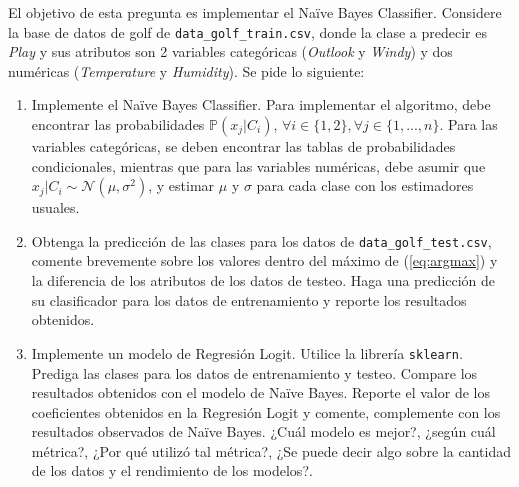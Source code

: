 \documentclass[letterpaper,11pt]{article}
\theoremstyle{plain}
\theoremstyle{definition}
\newcommand{\1}{\mathbbm{1}}
\begin{document}
\begin{enumerate}
El objetivo de esta pregunta es implementar el Naïve Bayes Classifier. Considere la base de datos de golf de \texttt{data\_golf\_train.csv}, donde la clase a predecir es \textit{Play} y sus atributos son 2 variables categóricas (\textit{Outlook} y \textit{Windy}) y dos numéricas (\textit{Temperature} y \textit{Humidity}). Se pide lo siguiente:

\begin{enumerate}
    \item Implemente el Naïve Bayes Classifier. Para implementar el algoritmo, debe encontrar las probabilidades $\mathbb{P}(x_j|C_i)$, $\forall i \in \{1,2\}, \forall j\in \{1,...,n\}$. Para las variables categóricas, se deben encontrar las tablas de probabilidades condicionales, mientras que para las variables numéricas, debe asumir que $x_j|C_i\sim \mathcal{N}(\mu,\sigma^2)$, y estimar $\mu$ y $\sigma$ para cada clase con los estimadores usuales.
    
    \item Obtenga la predicción de las clases para los datos de \texttt{data\_golf\_test.csv}, comente brevemente sobre los valores dentro del máximo de (\ref{eq:argmax}) y la diferencia de los atributos de los datos de testeo. Haga una predicción de su clasificador para los datos de entrenamiento y reporte los resultados obtenidos. 
    
    \item Implemente un modelo de Regresión Logit. Utilice la librería \texttt{sklearn}. Prediga las clases para los datos de entrenamiento y testeo. Compare los resultados obtenidos con el modelo de Naïve Bayes. Reporte el valor de los coeficientes obtenidos en la Regresión Logit y comente, complemente con los resultados observados de Naïve Bayes. ¿Cuál modelo es mejor?, ¿según cuál métrica?, ¿Por qué utilizó tal métrica?, ¿Se puede decir algo sobre la cantidad de los datos y el rendimiento de los modelos?.
\end{enumerate}









\end{enumerate}
\end{document}

